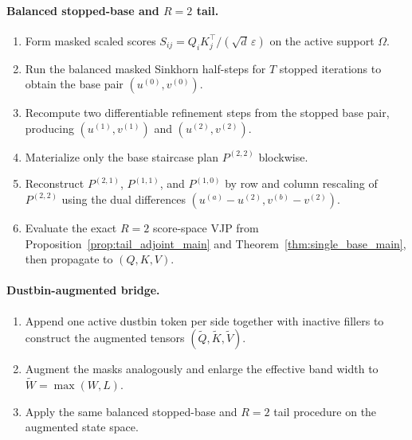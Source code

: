 \paragraph{Balanced stopped-base and $R=2$ tail.}
\begin{enumerate}
    \item Form masked scaled scores $S_{ij}=Q_iK_j^\top/(\sqrt{d}\,\varepsilon)$ on the active support $\Omega$.
    \item Run the balanced masked Sinkhorn half-steps for $T$ stopped iterations to obtain the base pair $(u^{(0)},v^{(0)})$.
    \item Recompute two differentiable refinement steps from the stopped base pair, producing $(u^{(1)},v^{(1)})$ and $(u^{(2)},v^{(2)})$.
    \item Materialize only the base staircase plan $P^{(2,2)}$ blockwise.
    \item Reconstruct $P^{(2,1)}$, $P^{(1,1)}$, and $P^{(1,0)}$ by row and column rescaling of $P^{(2,2)}$ using the dual differences $(u^{(a)}-u^{(2)}, v^{(b)}-v^{(2)})$.
    \item Evaluate the exact $R=2$ score-space VJP from Proposition~\ref{prop:tail_adjoint_main} and Theorem~\ref{thm:single_base_main}, then propagate to $(Q,K,V)$.
\end{enumerate}

\paragraph{Dustbin-augmented bridge.}
\begin{enumerate}
    \item Append one active dustbin token per side together with inactive fillers to construct the augmented tensors $(\widetilde Q,\widetilde K,\widetilde V)$.
    \item Augment the masks analogously and enlarge the effective band width to $\widetilde W=\max(W,L)$.
    \item Apply the same balanced stopped-base and $R=2$ tail procedure on the augmented state space.
\end{enumerate}

